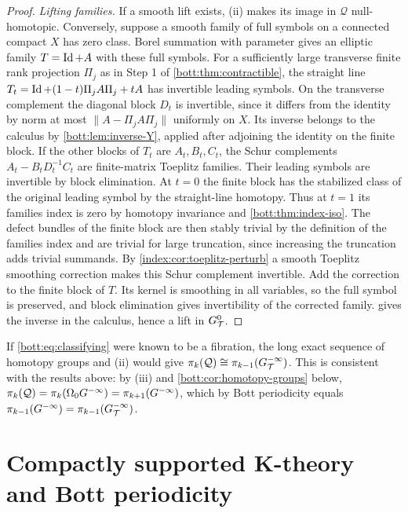 \begin{proof}
  \emph{Lifting families.} If a smooth lift exists, (ii) makes its image in
  $\mathcal Q$ null-homotopic. Conversely, suppose a smooth family of full
  symbols on a connected compact $X$ has zero class. Borel summation with
  parameter gives an elliptic family $T=\operatorname{Id}+A$ with these full symbols.
  For a sufficiently large transverse finite rank projection $\Pi_j$ as
  in Step 1 of \cref{bott:thm:contractible}, the straight line
  $T_t=\operatorname{Id}+(1-t)\Pi_jA\Pi_j+tA$ has invertible leading symbols. On the
  transverse complement the diagonal block $D_t$ is invertible, since it
  differs from the identity by norm at most $\|A-\Pi_jA\Pi_j\|$ uniformly
  on $X$. Its inverse belongs to the calculus by
  \cref{bott:lem:inverse-Y}, applied after adjoining the identity on the
  finite block. If the other blocks of $T_t$ are $A_t,B_t,C_t$, the Schur
  complements $A_t-B_tD_t^{-1}C_t$ are finite-matrix Toeplitz families.
  Their leading symbols are invertible by block elimination. At $t=0$
  the finite block has the stabilized class of the original leading
  symbol by the straight-line homotopy. Thus at $t=1$ its families index
  is zero by homotopy invariance and \cref{bott:thm:index-iso}.
  The defect bundles of the finite block are then stably trivial by the
  definition of the families index and are trivial for large truncation,
  since increasing the truncation adds trivial summands. By
  \cref{index:cor:toeplitz-perturb} a smooth Toeplitz smoothing correction
  makes this Schur complement invertible. Add the correction to the
  finite block of $T$. Its kernel is smoothing in all variables, so the
  full symbol is preserved, and block elimination gives invertibility
  of the corrected family.  gives the inverse
  in the calculus, hence a lift in $G^{0}_{\mathcal{T}}$.
\end{proof}

\begin{remark}
  If \eqref{bott:eq:classifying} were known to be a fibration, the long exact sequence of
  homotopy groups and (ii) would give $\pi_k(\mathcal Q)\cong\pi_{k-1}(G^{-\infty}_{\mathcal{T}})$. This is
  consistent with the results above: by (iii) and \cref{bott:cor:homotopy-groups} below,
  $\pi_k(\mathcal Q)=\pi_k(\Omega_0G^{-\infty})=\pi_{k+1}(G^{-\infty})$, which by Bott periodicity equals
  $\pi_{k-1}(G^{-\infty})=\pi_{k-1}(G^{-\infty}_{\mathcal{T}})$.
\end{remark}

\section[Compactly supported K-theory]{Compactly supported K-theory and Bott periodicity}\label{bott:sec:Kc}

